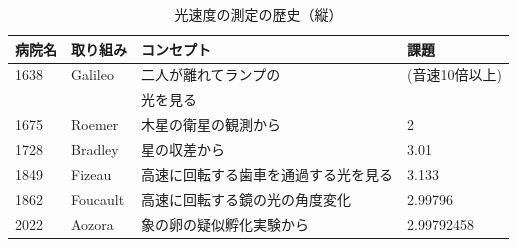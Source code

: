 \documentclass[11pt,a4paper]{ltjsreport}
\newcommand{\bhline}{\noalign{\hrule height 1.2pt}} %
\begin{document}
\begin{landscape}%
    \begin{table}[!ph]
        \caption{光速度の測定の歴史（縦）}
        \label{table:SpeedOfLightTate}
        \vspace{5mm}
        \centering
        \begin{tabular}{llll}
            \bhline
            病院名  & 取り組み     & コンセプト              & 課題         \\
            \hline
            1638 & Galileo  & 二人が離れてランプの         & (音速10倍以上)  \\
                 &          & 光を見る               &            \\
            1675 & Roemer   & 木星の衛星の観測から         & 2          \\
            1728 & Bradley  & 星の収差から             & 3.01       \\
            1849 & Fizeau   & 高速に回転する歯車を通過する光を見る & 3.133      \\
            1862 & Foucault & 高速に回転する鏡の光の角度変化    & 2.99796    \\
            2022 & Aozora   & 象の卵の疑似孵化実験から       & 2.99792458 \\
            \hline
        \end{tabular}
    \end{table}
\end{landscape}

\end{document}
